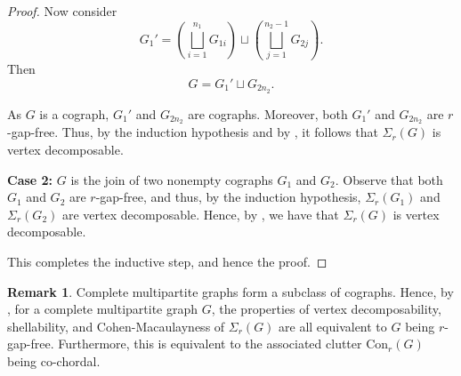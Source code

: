 \documentclass[12pt,reqno]{amsart}
\theoremstyle{definition}
\newtheorem{remark}[proposition]{Remark}
\begin{document}
\begin{proof}
Now consider
\[
G_1' = \left( \bigsqcup_{i=1}^{n_1} G_{1i} \right) \sqcup \left( \bigsqcup_{j=1}^{n_2-1} G_{2j} \right).
\]
Then
\[
G = G_1' \sqcup G_{2n_2}.
\]

As $G$ is a cograph, $G_1'$ and $G_{2n_2}$ are cographs. Moreover, both $G_1'$ and $G_{2n_2}$ are $r$-gap-free. Thus, by the induction hypothesis and by , it follows that $\Sigma_r(G)$ is vertex decomposable.

\medskip
\noindent
{\bf Case 2:} $G$ is the join of two nonempty cographs $G_1$ and $G_2$. Observe that both $G_1$ and $G_2$ are $r$-gap-free, and thus, by the induction hypothesis, $\Sigma_r(G_1)$ and $\Sigma_r(G_2)$ are vertex decomposable. Hence, by , we have that $\Sigma_r(G)$ is vertex decomposable.

\noindent
This completes the inductive step, and hence the proof.
\end{proof}

\begin{remark}
    Complete multipartite graphs form a subclass of cographs. Hence, by , for a complete multipartite graph $G$, the properties of vertex decomposability, shellability, and Cohen-Macaulayness of $\Sigma_r(G)$ are all equivalent to $G$ being $r$-gap-free. Furthermore, this is equivalent to the associated clutter $\mathrm{Con}_r(G)$ being co-chordal.

\end{remark}
    
\end{document}
